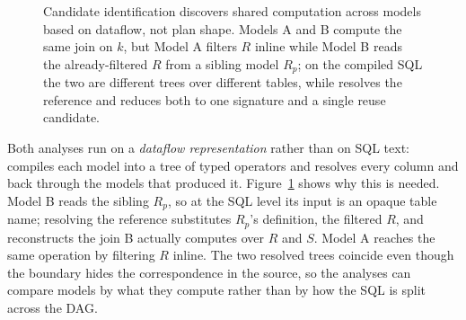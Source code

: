 \begin{figure}[tb]
\centering
{}
\inv
\caption{
Candidate identification discovers shared computation across models based on dataflow, not plan shape.
Models A and B compute the same join on $k$, but Model A filters $R$ inline while Model B reads the already-filtered $R$ from a sibling model $R_p$; on the compiled SQL the two are different trees over different tables, while \tool{} resolves the reference and reduces both to one signature and a single reuse candidate.}
\label{fig:dataflow-grouping}
\inv
\end{figure}

Both analyses run on a \emph{dataflow representation} rather than on SQL text: \tool{} compiles each model into a tree of typed operators and resolves every column and  back through the models that produced it. Figure~\ref{fig:dataflow-grouping} shows why this is needed. Model B reads the sibling $R_p$, so at the SQL level its input is an opaque table name; resolving the reference substitutes $R_p$'s definition, the filtered $R$, and reconstructs the join B actually computes over $R$ and $S$. Model A reaches the same operation by filtering $R$ inline.
The two resolved trees coincide even though the  boundary hides the correspondence in the source, so the analyses can compare models by what they compute rather than by how the SQL is split across the DAG.

